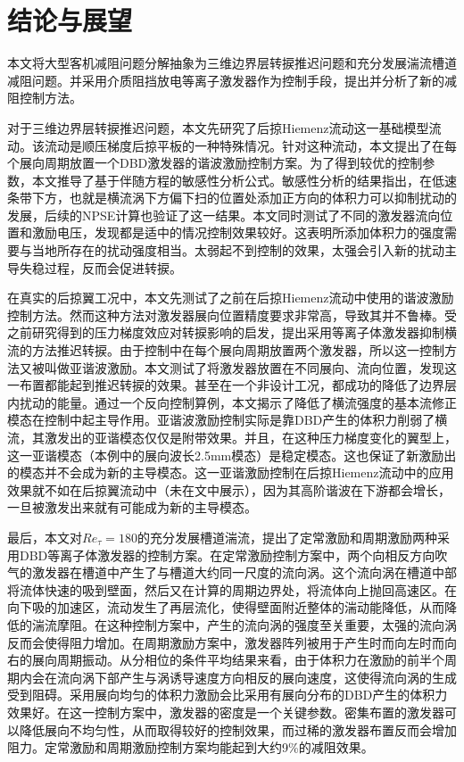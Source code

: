 \chapter{结论与展望}
本文将大型客机减阻问题分解抽象为三维边界层转捩推迟问题和充分发展湍流槽道减阻问题。并采用介质阻挡放电等离子激发器作为控制手段，提出并分析了新的减阻控制方法。

对于三维边界层转捩推迟问题，本文先研究了后掠Hiemenz流动这一基础模型流动。该流动是顺压梯度后掠平板的一种特殊情况。针对这种流动，本文提出了在每个展向周期放置一个DBD激发器的谐波激励控制方案。为了得到较优的控制参数，本文推导了基于伴随方程的敏感性分析公式。敏感性分析的结果指出，在低速条带下方，也就是横流涡下方偏下扫的位置处添加正方向的体积力可以抑制扰动的发展，后续的NPSE计算也验证了这一结果。本文同时测试了不同的激发器流向位置和激励电压，发现都是适中的情况控制效果较好。这表明所添加体积力的强度需要与当地所存在的扰动强度相当。太弱起不到控制的效果，太强会引入新的扰动主导失稳过程，反而会促进转捩。

在真实的后掠翼工况中，本文先测试了之前在后掠Hiemenz流动中使用的谐波激励控制方法。然而这种方法对激发器展向位置精度要求非常高，导致其并不鲁棒。受之前研究得到的压力梯度效应对转捩影响的启发，提出采用等离子体激发器抑制横流的方法推迟转捩。由于控制中在每个展向周期放置两个激发器，所以这一控制方法又被叫做亚谐波激励。本文测试了将激发器放置在不同展向、流向位置，发现这一布置都能起到推迟转捩的效果。甚至在一个非设计工况，都成功的降低了边界层内扰动的能量。通过一个反向控制算例，本文揭示了降低了横流强度的基本流修正模态在控制中起主导作用。亚谐波激励控制实际是靠DBD产生的体积力削弱了横流，其激发出的亚谐模态仅仅是附带效果。并且，在这种压力梯度变化的翼型上，这一亚谐模态（本例中的展向波长2.5mm模态）是稳定模态。这也保证了新激励出的模态并不会成为新的主导模态。这一亚谐激励控制在后掠Hiemenz流动中的应用效果就不如在后掠翼流动中（未在文中展示），因为其高阶谐波在下游都会增长，一旦被激发出来就有可能成为新的主导模态。

最后，本文对$Re_\tau=180$的充分发展槽道湍流，提出了定常激励和周期激励两种采用DBD等离子体激发器的控制方案。在定常激励控制方案中，两个向相反方向吹气的激发器在槽道中产生了与槽道大约同一尺度的流向涡。这个流向涡在槽道中部将流体快速的吸到壁面，然后又在计算的周期边界处，将流体向上抛回高速区。在向下吸的加速区，流动发生了再层流化，使得壁面附近整体的湍动能降低，从而降低的湍流摩阻。在这种控制方案中，产生的流向涡的强度至关重要，太强的流向涡反而会使得阻力增加。在周期激励方案中，激发器阵列被用于产生时而向左时而向右的展向周期振动。从分相位的条件平均结果来看，由于体积力在激励的前半个周期内会在流向涡下部产生与涡诱导速度方向相反的展向速度，这使得流向涡的生成受到阻碍。采用展向均匀的体积力激励会比采用有展向分布的DBD产生的体积力效果好。在这一控制方案中，激发器的密度是一个关键参数。密集布置的激发器可以降低展向不均匀性，从而取得较好的控制效果，而过稀的激发器布置反而会增加阻力。定常激励和周期激励控制方案均能起到大约9\%的减阻效果。

